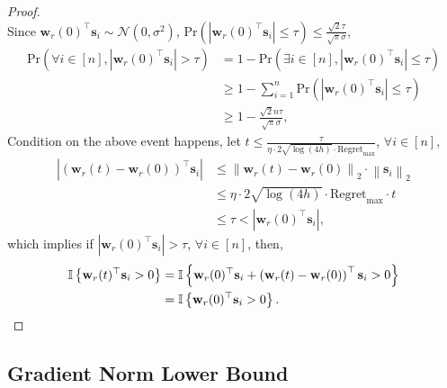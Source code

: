 \documentclass[10pt]{article}
\def\rvs{{\mathbf{s}}}
\def\rvw{{\mathbf{w}}}
\def\pr{{\text{Pr}}}
\def\regret{{\text{Regret}}}
\def\sI{{\mathbb{I}}}
\def\gN{{\mathcal{N}}}
\begin{document}
\begin{proof}
\begin{equation*}
\end{equation*}
Since $\rvw_r(0)^\top \rvs_i \sim \gN(0, \sigma^2)$, $\pr\left(\left| \rvw_r(0)^\top \rvs_i \right| \le \tau\right) \le  \frac{\sqrt{2}\tau}{\sqrt{\pi}\sigma}$,
\begin{equation*}
\begin{split}
	\pr\left(\forall i \in [n], \left| \rvw_r(0)^\top \rvs_i \right| > \tau\right) &= 1 - \pr\left(\exists i \in [n], \left| \rvw_r(0)^\top \rvs_i \right| \le \tau\right) \\
	&\ge 1 - \sum\limits_{i=1}^{n}{ \pr\left(\left| \rvw_r(0)^\top \rvs_i \right| \le \tau\right) } \\
	&\ge 1 - \frac{\sqrt{2}n\tau}{\sqrt{\pi}\sigma},
\end{split}
\end{equation*}
Condition on the above event happens, let $t \le \frac{\tau}{ \eta \cdot 2 \sqrt{\log{\left(4h\right)}} \cdot \regret_{\max} }$, $\forall i \in [n]$,
\begin{equation*}
\begin{split}
	\left| \left( \rvw_r(t) - \rvw_r(0) \right)^\top \rvs_i \right| &\le \left\| \rvw_r(t) - \rvw_r(0) \right\|_2 \cdot \left\| \rvs_i \right\|_2 \\
	&\le \eta \cdot 2 \sqrt{\log{\left(4h\right)}} \cdot \regret_{\max} \cdot t \\
	&\le \tau < \left| \rvw_r(0)^\top \rvs_i \right|,
\end{split}
\end{equation*}
which implies if $\left| \rvw_r(0)^\top \rvs_i \right| > \tau$, $\forall i \in [n]$, then,
\begin{equation*}
\begin{split}
	\sI\left\{ \rvw_r(t)^\top \rvs_i > 0 \right\} &= \sI\left\{ \rvw_r(0)^\top \rvs_i  + \left( \rvw_r(t) - \rvw_r(0) \right)^\top \rvs_i > 0 \right\} \\
	&= \sI\left\{ \rvw_r(0)^\top \rvs_i > 0 \right\}. \qedhere
\end{split}
\end{equation*}
\end{proof}

\subsection{Gradient Norm Lower Bound}
\end{document}
